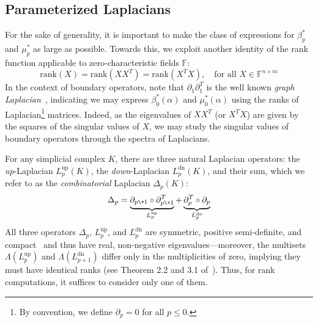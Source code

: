 \subsection{Parameterized Laplacians}\label{sec:laplacian_theory2}
 For the sake of generality, it is important to make the class of expressions for $\beta_p^\ast$ and $\mu_p^\ast$ as large as possible.
Towards this, we exploit another identity of the rank function applicable to zero-characteristic fields $\mathbb{F}$:
$$\mathrm{rank}(X) = \mathrm{rank}(X X^T) = \mathrm{rank}(X^T X), \quad \text{for all } X \in \mathbb{F}^{n \times m}$$ 
In the context of boundary operators, note that $\partial_1 \partial_1^T$ is the well known \emph{graph Laplacian}~\cite{chung1997spectral}, indicating we may express $\beta_0^\ast(\alpha)$ and $\mu_0^\ast(\alpha)$ using the ranks of Laplacian\footnote{By convention, we define $\partial_p = 0$ for all $p \leq 0$.} matrices.
Indeed, as the eigenvalues of $XX^T$ (or $X^T X$) are given by the squares of the singular values of $X$, we may study the singular values of boundary operators through the spectra of Laplacians.  

For any simplicial complex $K$, there are three natural Laplacian operators: the \emph{up}-Laplacian $L_p^{\text{up}}(K)$, the \emph{down}-Laplacian $L_p^{\text{dn}}(K)$, and their sum, which we refer to as the \emph{combinatorial} Laplacian $\Delta_p(K)$: 
\begin{equation}\label{eq:comb_lap}
	\Delta_p = \underbrace{\partial_{p\+1} \circ \partial_{p\+1}^T}_{L_p^{\text{up}}} + \underbrace{\partial_{p}^T  \circ  \partial_{p}}_{L_p^{\text{dn}}} 
\end{equation}
\noindent 
All three operators $\Delta_p$, $L_p^{\text{up}}$, and $L_p^{\text{dn}}$ are symmetric, positive semi-definite, and compact~\cite{memoli2022persistent} and thus have real, non-negative eigenvalues---moreover, the multisets $\Lambda(L_p^{\text{up}})$ and $\Lambda(L_{p+1}^{\text{dn}})$ differ only in the multiplicities of zero, implying they must have identical ranks (see Theorem 2.2 and 3.1 of~\cite{horak2013spectra}). 
Thus, for rank computations, it suffices to consider only one of them.


